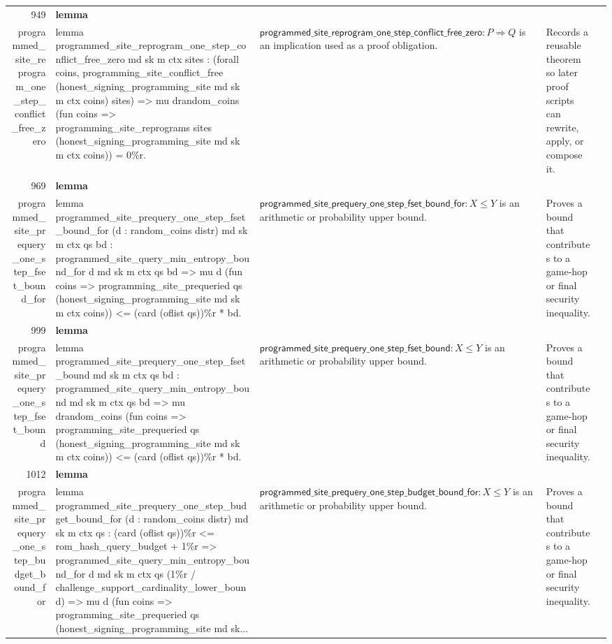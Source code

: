 \documentclass[10pt]{article}
\newcommand{\ec}[1]{\begingroup\ttfamily\scriptsize #1\endgroup}
\begin{document}
\begin{longtable}{r L{0.17\textwidth} L{0.26\textwidth} L{0.27\textwidth} L{0.20\textwidth}}
949 & \textbf{lemma}\\\ec{programmed\_site\_reprogram\_one\_step\_conflict\_free\_zero} & \ec{lemma programmed\_site\_reprogram\_one\_step\_conflict\_free\_zero md sk m ctx sites : (forall coins, programming\_site\_conflict\_free (honest\_signing\_programming\_site md sk m ctx coins) sites) => mu drandom\_coins (fun coins => programming\_site\_reprograms sites (honest\_signing\_programming\_site md sk m ctx coins)) = 0\%r.} & \(\mathsf{programmed\_site\_reprogram\_one\_step\_conflict\_free\_zero} : P \Rightarrow Q\) is an implication used as a proof obligation. & Records a reusable theorem so later proof scripts can rewrite, apply, or compose it. \\
969 & \textbf{lemma}\\\ec{programmed\_site\_prequery\_one\_step\_fset\_bound\_for} & \ec{lemma programmed\_site\_prequery\_one\_step\_fset\_bound\_for (d : random\_coins distr) md sk m ctx qs bd : programmed\_site\_query\_min\_entropy\_bound\_for d md sk m ctx qs bd => mu d (fun coins => programming\_site\_prequeried qs (honest\_signing\_programming\_site md sk m ctx coins)) <= (card (oflist qs))\%r * bd.} & \(\mathsf{programmed\_site\_prequery\_one\_step\_fset\_bound\_for} : X \le Y\) is an arithmetic or probability upper bound. & Proves a bound that contributes to a game-hop or final security inequality. \\
999 & \textbf{lemma}\\\ec{programmed\_site\_prequery\_one\_step\_fset\_bound} & \ec{lemma programmed\_site\_prequery\_one\_step\_fset\_bound md sk m ctx qs bd : programmed\_site\_query\_min\_entropy\_bound md sk m ctx qs bd => mu drandom\_coins (fun coins => programming\_site\_prequeried qs (honest\_signing\_programming\_site md sk m ctx coins)) <= (card (oflist qs))\%r * bd.} & \(\mathsf{programmed\_site\_prequery\_one\_step\_fset\_bound} : X \le Y\) is an arithmetic or probability upper bound. & Proves a bound that contributes to a game-hop or final security inequality. \\
1012 & \textbf{lemma}\\\ec{programmed\_site\_prequery\_one\_step\_budget\_bound\_for} & \ec{lemma programmed\_site\_prequery\_one\_step\_budget\_bound\_for (d : random\_coins distr) md sk m ctx qs : (card (oflist qs))\%r <= rom\_hash\_query\_budget + 1\%r => programmed\_site\_query\_min\_entropy\_bound\_for d md sk m ctx qs (1\%r / challenge\_support\_cardinality\_lower\_bound) => mu d (fun coins => programming\_site\_prequeried qs (honest\_signing\_programming\_site md sk...} & \(\mathsf{programmed\_site\_prequery\_one\_step\_budget\_bound\_for} : X \le Y\) is an arithmetic or probability upper bound. & Proves a bound that contributes to a game-hop or final security inequality. \\

\end{longtable}
\end{document}
